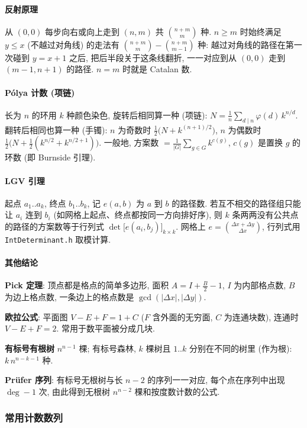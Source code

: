 	\paragraph{反射原理}
		从 $(0,0)$ 每步向右或向上走到 $(n,m)$ 共 $\binom{n+m}{m}$ 种. $n\ge m$ 时始终满足 $y\le x$ (不越过对角线) 的走法有 $\binom{n+m}{m}-\binom{n+m}{m-1}$ 种: 越过对角线的路径在第一次碰到 $y=x+1$ 之后, 把后半段关于这条线翻折, 一一对应到从 $(0,0)$ 走到 $(m-1,n+1)$ 的路径. $n=m$ 时就是 Catalan 数.
	\paragraph{Pólya 计数 (项链)}
		长为 $n$ 的环用 $k$ 种颜色染色, 旋转后相同算一种 (项链): $N=\frac1n\sum_{d\mid n}\varphi(d)\,k^{n/d}$.
		翻转后相同也算一种 (手镯): $n$ 为奇数时 $\frac12\big(N+k^{(n+1)/2}\big)$, $n$ 为偶数时 $\frac12\big(N+\frac12(k^{n/2}+k^{n/2+1})\big)$.
		一般地, 方案数 $=\frac{1}{|G|}\sum_{g\in G}k^{c(g)}$, $c(g)$ 是置换 $g$ 的环数 (即 Burnside 引理).
	\paragraph{LGV 引理}
		起点 $a_1..a_k$, 终点 $b_1..b_k$, 记 $e(a,b)$ 为 $a$ 到 $b$ 的路径数. 若互不相交的路径组只能让 $a_i$ 连到 $b_i$ (如网格上起点、终点都按同一方向排好序), 则 $k$ 条两两没有公共点的路径的方案数等于行列式 $\det\big[e(a_i,b_j)\big]_{k\times k}$. 网格上 $e=\binom{\Delta x+\Delta y}{\Delta x}$, 行列式用 \texttt{IntDeterminant.h} 取模计算.
	\paragraph{其他结论}
		\begin{compactitem}
		\item \textbf{Pick 定理}: 顶点都是格点的简单多边形, 面积 $A=I+\frac{B}{2}-1$, $I$ 为内部格点数, $B$ 为边上格点数, 一条边上的格点数是 $\gcd(|\Delta x|,|\Delta y|)$.
		\item \textbf{欧拉公式}: 平面图 $V-E+F=1+C$ ($F$ 含外面的无穷面, $C$ 为连通块数), 连通时 $V-E+F=2$. 常用于数平面被分成几块.
		\item \textbf{有标号有根树} $n^{n-1}$ 棵; 有标号森林, $k$ 棵树且 $1..k$ 分别在不同的树里 (作为根): $k\,n^{n-k-1}$ 种.
		\item \textbf{Prüfer 序列}: 有标号无根树与长 $n-2$ 的序列一一对应, 每个点在序列中出现 $\deg-1$ 次, 由此得到无根树 $n^{n-2}$ 棵和按度数计数的公式.
		\end{compactitem}

\subsubsection{常用计数数列}
